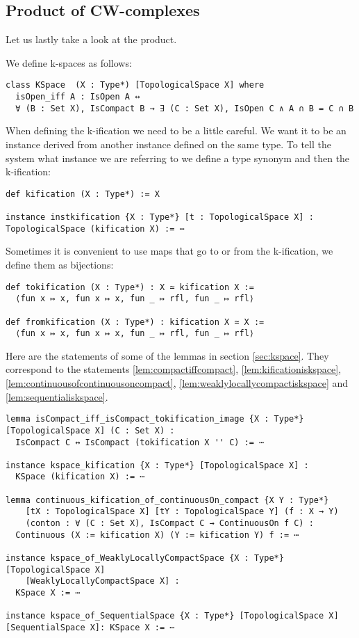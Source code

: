 \subsection{Product of CW-complexes}

Let us lastly take a look at the product. 

We define k-spaces as follows: 

\begin{lstlisting}
class KSpace  (X : Type*) [TopologicalSpace X] where
  isOpen_iff A : IsOpen A ↔
  ∀ (B : Set X), IsCompact B → ∃ (C : Set X), IsOpen C ∧ A ∩ B = C ∩ B
\end{lstlisting}

When defining the k-ification we need to be a little careful. 
We want it to be an instance derived from another instance defined on the same type. 
To tell the system what instance we are referring to we define a type synonym and then the k-ification: 

\begin{lstlisting}
def kification (X : Type*) := X

instance instkification {X : Type*} [t : TopologicalSpace X] : TopologicalSpace (kification X) := ⋯
\end{lstlisting}

Sometimes it is convenient to use maps that go to or from the k-ification, we define them as bijections:

\begin{lstlisting}
def tokification (X : Type*) : X ≃ kification X :=
  ⟨fun x ↦ x, fun x ↦ x, fun _ ↦ rfl, fun _ ↦ rfl⟩
  
def fromkification (X : Type*) : kification X ≃ X :=
  ⟨fun x ↦ x, fun x ↦ x, fun _ ↦ rfl, fun _ ↦ rfl⟩
\end{lstlisting}

Here are the statements of some of the lemmas in section \ref{sec:kspace}. 
They correspond to the statements \ref{lem:compactiffcompact}, \ref{lem:kificationiskspace}, \ref{lem:continuousofcontinuousoncompact}, \ref{lem:weaklylocallycompactiskspace} and \ref{lem:sequentialiskspace}.

\begin{lstlisting}
lemma isCompact_iff_isCompact_tokification_image {X : Type*} [TopologicalSpace X] (C : Set X) :
  IsCompact C ↔ IsCompact (tokification X '' C) := ⋯

instance kspace_kification {X : Type*} [TopologicalSpace X] : 
  KSpace (kification X) := ⋯

lemma continuous_kification_of_continuousOn_compact {X Y : Type*} 
    [tX : TopologicalSpace X] [tY : TopologicalSpace Y] (f : X → Y) 
    (conton : ∀ (C : Set X), IsCompact C → ContinuousOn f C) :
  Continuous (X := kification X) (Y := kification Y) f := ⋯

instance kspace_of_WeaklyLocallyCompactSpace {X : Type*}[TopologicalSpace X]
    [WeaklyLocallyCompactSpace X] : 
  KSpace X := ⋯

instance kspace_of_SequentialSpace {X : Type*} [TopologicalSpace X] [SequentialSpace X]: KSpace X := ⋯
\end{lstlisting}

